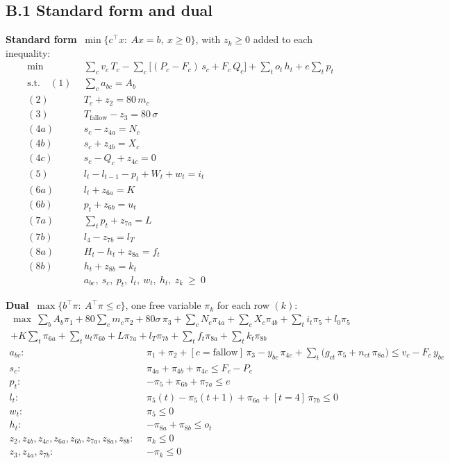 \subsection*{B.1 \quad Standard form and dual}

\textbf{Standard form} $\ \min\{c^\top x:\ Ax=b,\ x\ge 0\}$, with $z_k\ge 0$ added to each inequality:
\begin{align*}
\min\ \ & \textstyle\sum_c v_c\,T_c-\sum_c\big[(P_c-F_c)\,s_c+F_c\,Q_c\big]+\sum_t o_t\,h_t+e\sum_t p_t\\[4pt]
\text{s.t.}\quad
(1)\ \ & \textstyle\sum_c a_{bc}=A_b\\
(2)\ \ & T_c+z_2=80\,m_c\\
(3)\ \ & T_{\text{fallow}}-z_3=80\,\sigma\\
(4a)\ \ & s_c-z_{4a}=N_c\\
(4b)\ \ & s_c+z_{4b}=X_c\\
(4c)\ \ & s_c-Q_c+z_{4c}=0\\
(5)\ \ & l_t-l_{t-1}-p_t+W_t+w_t=i_t\\
(6a)\ \ & l_t+z_{6a}=K\\
(6b)\ \ & p_t+z_{6b}=u_t\\
(7a)\ \ & \textstyle\sum_t p_t+z_{7a}=L\\
(7b)\ \ & l_4-z_{7b}=l_T\\
(8a)\ \ & H_t-h_t+z_{8a}=f_t\\
(8b)\ \ & h_t+z_{8b}=k_t\\[4pt]
& a_{bc},\ s_c,\ p_t,\ l_t,\ w_t,\ h_t,\ z_k\ \ge\ 0
\end{align*}

\textbf{Dual} $\ \max\{b^\top\pi:\ A^\top\pi\le c\}$, one free variable $\pi_k$ for each row $(k)$:
\begin{multline*}
\max\ \sum_b A_b\pi_1+80\sum_c m_c\pi_2+80\sigma\,\pi_3+\sum_c N_c\pi_{4a}+\sum_c X_c\pi_{4b}+\sum_t i_t\pi_5+l_0\pi_5\\
+K\sum_t\pi_{6a}+\sum_t u_t\pi_{6b}+L\pi_{7a}+l_T\pi_{7b}+\sum_t f_t\pi_{8a}+\sum_t k_t\pi_{8b}
\end{multline*}
\begin{align*}
a_{bc}:\ \ &\pi_1+\pi_2+[c{=}\text{fallow}]\,\pi_3-y_{bc}\,\pi_{4c}+\textstyle\sum_t\big(g_{ct}\,\pi_5+n_{ct}\,\pi_{8a}\big)\le v_c-F_c\,y_{bc}\\
s_c:\ \ &\pi_{4a}+\pi_{4b}+\pi_{4c}\le F_c-P_c\\
p_t:\ \ &-\pi_5+\pi_{6b}+\pi_{7a}\le e\\
l_t:\ \ &\pi_5(t)-\pi_5(t{+}1)+\pi_{6a}+[t{=}4]\,\pi_{7b}\le 0\\
w_t:\ \ &\pi_5\le 0\\
h_t:\ \ &-\pi_{8a}+\pi_{8b}\le o_t\\
z_2,z_{4b},z_{4c},z_{6a},z_{6b},z_{7a},z_{8a},z_{8b}:\ \ &\pi_k\le 0\\
z_3,z_{4a},z_{7b}:\ \ &-\pi_k\le 0
\end{align*}

